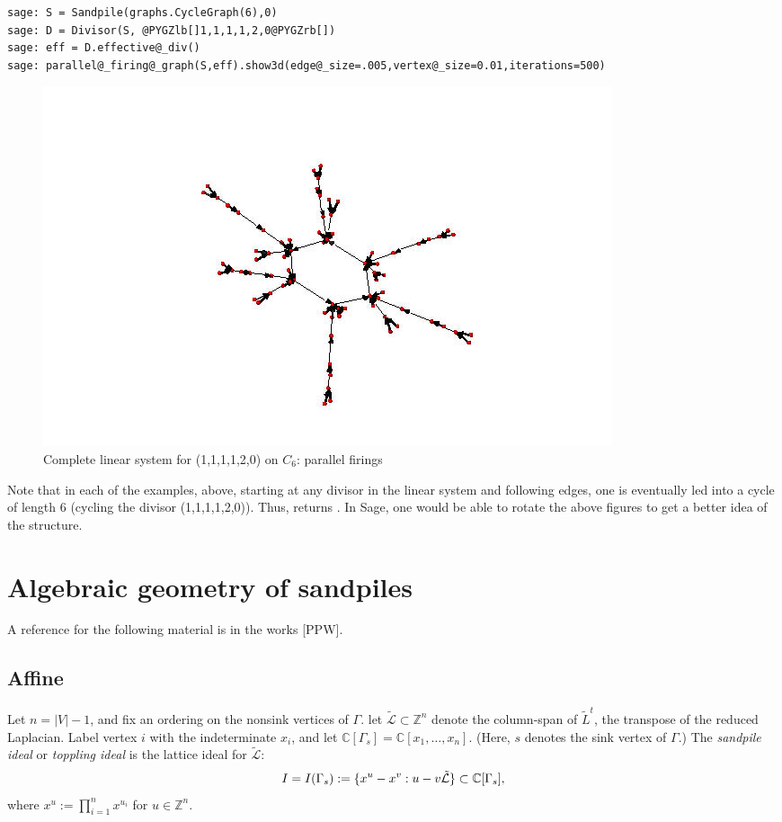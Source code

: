 \documentclass[letterpaper,10pt,english]{manual}
\begin{document}
\begin{Verbatim}[commandchars=@\[\]]
sage: S = Sandpile(graphs.CycleGraph(6),0)
sage: D = Divisor(S, @PYGZlb[]1,1,1,1,2,0@PYGZrb[])
sage: eff = D.effective@_div()
sage: parallel@_firing@_graph(S,eff).show3d(edge@_size=.005,vertex@_size=0.01,iterations=500)
\end{Verbatim}
\begin{figure}[htbp]
\centering

\includegraphics{C_6-parallel.png}
\caption{Complete linear system for (1,1,1,1,2,0) on $C_6$: parallel firings}\end{figure}

Note that in each of the examples, above, starting at any divisor in the linear
system and following edges, one is eventually led into a cycle of length 6
(cycling the divisor (1,1,1,1,2,0)).  Thus,  returns .  In
Sage, one would be able to rotate the above figures to get a better idea of the
structure.


\section{Algebraic geometry of sandpiles}

A reference for the following material is in the works {[}PPW{]}.


\subsection{Affine}

Let $n=|V|-1$, and fix an ordering on the nonsink vertices of $\Gamma$.  let
$\tilde{\mathcal{L}}\subset\mathbb{Z}^n$ denote the column-span of
$\tilde{L}^t$, the transpose of the reduced Laplacian.  Label vertex $i$ with the
indeterminate $x_i$, and let $\mathbb{C}[\Gamma_s] = \mathbb{C}[x_1,\dots,x_n]$.
(Here, $s$ denotes the sink vertex of $\Gamma$.) The \emph{sandpile ideal} or
\emph{toppling ideal} is the lattice ideal for $\tilde{\mathcal{L}}$:
\begin{gather}
\begin{split}I = I(\Gamma_s) := \{x^u-x^v: u-v
\tilde{\mathcal{L}}\}\subset\mathbb{C}[\Gamma_s],\end{split}\notag
\end{gather}
where $x^u := \prod_{i=1}^nx^{u_i}$ for $u\in\mathbb{Z}^n$.
\end{document}
